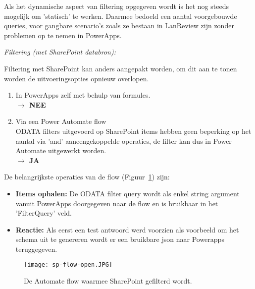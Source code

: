 Als het dynamische aspect van filtering opgegeven wordt is het nog steeds mogelijk om 'statisch' te werken. Daarmee bedoeld een aantal voorgebouwde queries, voor gangbare scenario's zoals ze bestaan in LanReview zijn zonder problemen op te nemen in PowerApps.

\textit{Filtering (met SharePoint databron):}

Filtering met SharePoint kan anders aangepakt worden, om dit aan te tonen worden de uitvoeringsopties opnieuw overlopen.
\begin{enumerate}
    \item In PowerApps zelf met behulp van formules.\\
    \textbf{$\rightarrow$ NEE}
    \item Via een Power Automate flow\\
    ODATA filters uitgevoerd op SharePoint items hebben geen beperking op het aantal via 'and' aaneengekoppelde operaties, de filter kan dus in Power Automate uitgewerkt worden.\\
    \textbf{$\rightarrow$ JA}
\end{enumerate}

De belangrijkste operaties van de flow (Figuur~\ref{fig:sp-flow-open}) zijn:
\begin{itemize}
    \item \textbf{Items ophalen:} De ODATA filter query wordt als enkel string argument vanuit PowerApps doorgegeven naar de flow en is bruikbaar in het 'FilterQuery' veld.
    \item \textbf{Reactie:} Als eerst een test antwoord werd voorzien als voorbeeld om het schema uit te genereren wordt er een bruikbare json naar Powerapps teruggegeven.
\end{itemize}

\begin{figure}[h!]
    \centering
    \texttt{[image: sp-flow-open.JPG]}
    \caption{De Automate flow waarmee SharePoint gefilterd wordt.}
    \label{fig:sp-flow-open}
\end{figure}

